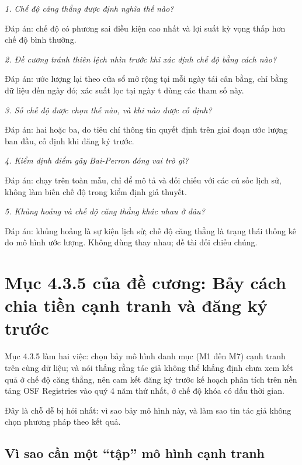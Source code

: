 {\itshape 1. Chế độ căng thẳng được định nghĩa thế nào?\par}

Đáp án: chế độ có phương sai điều kiện cao nhất và lợi suất kỳ vọng thấp hơn chế độ bình thường.

{\itshape 2. Đề cương tránh thiên lệch nhìn trước khi xác định chế độ bằng cách nào?\par}

Đáp án: ước lượng lại theo cửa sổ mở rộng tại mỗi ngày tái cân bằng, chỉ bằng dữ liệu đến ngày đó; xác suất lọc tại ngày t dùng các tham số này.

{\itshape 3. Số chế độ được chọn thế nào, và khi nào được cố định?\par}

Đáp án: hai hoặc ba, do tiêu chí thông tin quyết định trên giai đoạn ước lượng ban đầu, cố định khi đăng ký trước.

{\itshape 4. Kiểm định điểm gãy Bai-Perron đóng vai trò gì?\par}

Đáp án: chạy trên toàn mẫu, chỉ để mô tả và đối chiếu với các cú sốc lịch sử, không làm biến chế độ trong kiểm định giả thuyết.

{\itshape 5. Khủng hoảng và chế độ căng thẳng khác nhau ở đâu?\par}

Đáp án: khủng hoảng là sự kiện lịch sử; chế độ căng thẳng là trạng thái thống kê do mô hình ước lượng. Không dùng thay nhau; đề tài đối chiếu chúng.

\chapter{Mục 4.3.5 của đề cương: Bảy cách chia tiền cạnh tranh và đăng ký trước}

Mục 4.3.5 làm hai việc: chọn bảy mô hình danh mục (M1 đến M7) cạnh tranh trên cùng dữ liệu; và nói thẳng rằng tác giả không thể khẳng định chưa xem kết quả ở chế độ căng thẳng, nên cam kết đăng ký trước kế hoạch phân tích trên nền tảng OSF Registries vào quý 4 năm thứ nhất, ở chế độ khóa có dấu thời gian.

Đây là chỗ dễ bị hỏi nhất: vì sao bảy mô hình này, và làm sao tin tác giả không chọn phương pháp theo kết quả.

\section{Vì sao cần một “tập” mô hình cạnh tranh}


